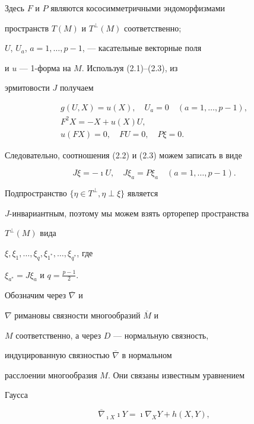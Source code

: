 Здесь $F$ и $P$ являются кососимметричными эндоморфизмами


пространств $T(M)$ и $T^\perp(M)$ соответственно;


$U$, $U_a$, $a=1,\dotsc,p-1$, --- касательные векторные поля


и $u$ --- 1-форма на $M$. Используя (2.1)--(2.3), из


эрмитовости  $J$ получаем


\begin{gather*}


g(U,X)=u(X),\quad U_a=0\quad (a=1,\dotsc,p-1),\\


F^2X=-X+u(X)U, \\


u(FX)=0,\quad FU=0,\quad P\xi=0.


\end{gather*}


Следовательно, соотношения (2.2) и (2.3) можем записать в виде


\begin{equation}


J\xi=-\imath U,\quad J\xi_a=P\xi_a \quad


(a=1,\dotsc,p-1).


\end{equation}





Подпространство  $\{\eta\in T^\perp, \eta\perp\xi\}$ является


$J$-инвариантным, поэтому мы можем взять орторепер пространства


$T^\perp(M)$ вида


$\xi,\xi_1,\dotsc,\xi_q,\xi_{1^*},\dotsc,\xi_{q^*}$, где


$\xi_{a^*}=J\xi_a$ и $q=\frac{p-1}{2}$.


Обозначим через $\overline\nabla$ и


$\nabla$ римановы связности многообразий $\overline M$ и


$M$ соответственно, а через $D$ --- нормальную связность,


индуцированную связностью $\overline\nabla$ в нормальном


расслоении многообразия  $M$. Они связаны известным уравнением


Гаусса


\begin{equation}


\overline\nabla_{\imath X}\imath Y=\imath


\nabla_XY+h(X,Y),


\end{equation}


